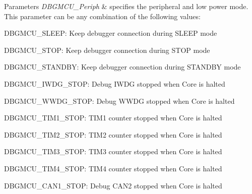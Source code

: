 \begin{DoxyParams}{Parameters}
{\em D\+B\+G\+M\+C\+U\+\_\+\+Periph} & specifies the peripheral and low power mode. This parameter can be any combination of the following values\+: \begin{DoxyItemize}
\item D\+B\+G\+M\+C\+U\+\_\+\+S\+L\+E\+EP\+: Keep debugger connection during S\+L\+E\+EP mode\end{DoxyItemize}
\begin{DoxyItemize}
\item D\+B\+G\+M\+C\+U\+\_\+\+S\+T\+OP\+: Keep debugger connection during S\+T\+OP mode\end{DoxyItemize}
\begin{DoxyItemize}
\item D\+B\+G\+M\+C\+U\+\_\+\+S\+T\+A\+N\+D\+BY\+: Keep debugger connection during S\+T\+A\+N\+D\+BY mode\end{DoxyItemize}
\begin{DoxyItemize}
\item D\+B\+G\+M\+C\+U\+\_\+\+I\+W\+D\+G\+\_\+\+S\+T\+OP\+: Debug I\+W\+DG stopped when Core is halted\end{DoxyItemize}
\begin{DoxyItemize}
\item D\+B\+G\+M\+C\+U\+\_\+\+W\+W\+D\+G\+\_\+\+S\+T\+OP\+: Debug W\+W\+DG stopped when Core is halted\end{DoxyItemize}
\begin{DoxyItemize}
\item D\+B\+G\+M\+C\+U\+\_\+\+T\+I\+M1\+\_\+\+S\+T\+OP\+: T\+I\+M1 counter stopped when Core is halted\end{DoxyItemize}
\begin{DoxyItemize}
\item D\+B\+G\+M\+C\+U\+\_\+\+T\+I\+M2\+\_\+\+S\+T\+OP\+: T\+I\+M2 counter stopped when Core is halted\end{DoxyItemize}
\begin{DoxyItemize}
\item D\+B\+G\+M\+C\+U\+\_\+\+T\+I\+M3\+\_\+\+S\+T\+OP\+: T\+I\+M3 counter stopped when Core is halted\end{DoxyItemize}
\begin{DoxyItemize}
\item D\+B\+G\+M\+C\+U\+\_\+\+T\+I\+M4\+\_\+\+S\+T\+OP\+: T\+I\+M4 counter stopped when Core is halted\end{DoxyItemize}
\begin{DoxyItemize}
\item D\+B\+G\+M\+C\+U\+\_\+\+C\+A\+N1\+\_\+\+S\+T\+OP\+: Debug C\+A\+N2 stopped when Core is halted\end{DoxyItemize}

\end{DoxyParams}
